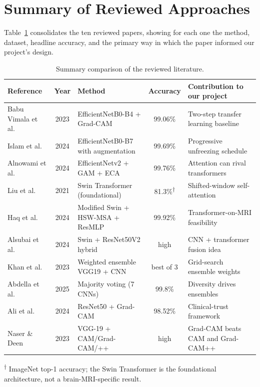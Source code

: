 \documentclass[12pt,a4paper,oneside]{report}
\begin{document}
\section{Summary of Reviewed Approaches}

Table~\ref{tab:litreview-summary} consolidates the ten reviewed papers, showing for each one the method, dataset, headline accuracy, and the primary way in which the paper informed our project's design.

\begin{table}[H]
  \centering
  \caption{Summary comparison of the reviewed literature.}
  \label{tab:litreview-summary}
  \begin{tabular}{p{2.4cm}cp{4.0cm}cp{4.2cm}}
    \toprule
    \textbf{Reference} & \textbf{Year} & \textbf{Method} & \textbf{Accuracy} & \textbf{Contribution to our project} \\
    \midrule
    Babu Vimala et al. & 2023 & EfficientNetB0-B4 + Grad-CAM & 99.06\% & Two-step transfer learning baseline \\
    Islam et al. & 2024 & EfficientNetB0-B7 with augmentation & 99.69\% & Progressive unfreezing schedule \\
    Alnowami et al. & 2024 & EfficientNetv2 + GAM + ECA & 99.76\% & Attention can rival transformers \\
    Liu et al. & 2021 & Swin Transformer (foundational) & 81.3\%\textsuperscript{$\dagger$} & Shifted-window self-attention \\
    Haq et al. & 2024 & Modified Swin + HSW-MSA + ResMLP & 99.92\% & Transformer-on-MRI feasibility \\
    Alsubai et al. & 2024 & Swin + ResNet50V2 hybrid & high & CNN + transformer fusion idea \\
    Khan et al. & 2023 & Weighted ensemble VGG19 + CNN & best of 3 & Grid-search ensemble weights \\
    Abdella et al. & 2025 & Majority voting (7 CNNs) & 99.8\% & Diversity drives ensembles \\
    Ali et al. & 2024 & ResNet50 + Grad-CAM & 98.52\% & Clinical-trust framework \\
    Naser \& Deen & 2023 & VGG-19 + CAM/Grad-CAM/++ & high & Grad-CAM beats CAM and Grad-CAM++ \\
    \bottomrule
  \end{tabular}
\end{table}

\textsuperscript{$\dagger$} ImageNet top-1 accuracy; the Swin Transformer is the foundational architecture, not a brain-MRI-specific result.
\end{document}
